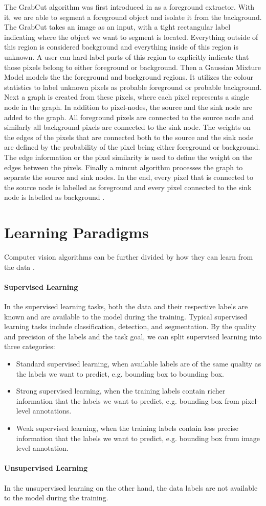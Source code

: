 The GrabCut algorithm was first introduced in \cite{Rother2004} as a foreground extractor. With it, we are able to segment a foreground object and isolate it from the background. The GrabCut takes an image as an input, with a tight rectangular label indicating where the object we want to segment is located. Everything outside of this region is considered background and everything inside of this region is unknown. A user can hard-label parts of this region to explicitly indicate that those pixels belong to either foreground or background. Then a Gaussian Mixture Model models the the foreground and background regions. It utilizes the colour statistics to label unknown pixels as probable foreground or probable background. Next a graph is created from these pixels, where each pixel represents a single node in the graph. In addition to pixel-nodes, the source and the sink node are added to the graph. All foreground pixels are connected to the source node and similarly all background pixels are connected to the sink node. The weights on the edges of the pixels that are connected both to the source and the sink node are defined by the probability of the pixel being either foreground or background. The edge information or the pixel similarity is used to define the weight on the edges between the pixels. Finally a mincut algorithm processes the graph to separate the source and sink nodes. In the end, every pixel that is connected to the source node is labelled as foreground and every pixel connected to the sink node is labelled as background \cite{opencv_grabcut}.


\section{Learning Paradigms}
Computer vision algorithms can be further divided by how they can learn from the data \cite{Alam2021}.

\paragraph{Supervised Learning} In the supervised learning tasks, both the data and their respective labels are known and are available to the model during the training. Typical supervised learning tasks include classification, detection, and segmentation. By the quality and precision of the labels and the task goal, we can split supervised learning into three categories:

\begin{itemize}
    \item Standard supervised learning, when available labels are of the same quality as the labels we want to predict, e.g. bounding box to bounding box.
    \item Strong supervised learning, when the training labels contain richer information that the labels we want to predict, e.g. bounding box from pixel-level annotations.
    \item Weak supervised learning, when the training labels contain less precise information that the labels we want to predict, e.g. bounding box from image level annotation.
\end{itemize}

\paragraph{Unsupervised Learning} In the unsupervised learning on the other hand, the data labels are not available to the model during the training.
